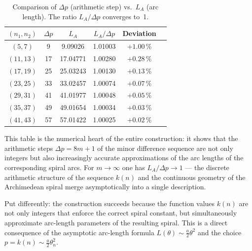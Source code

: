 \begin{table}[H]
\centering
\caption{Comparison of $\Delta p$ (arithmetic step) vs.\ $L_A$ (arc length).
  The ratio $L_A / \Delta p$ converges to~1.}
\renewcommand{\arraystretch}{1.2}
\begin{tabular}{cccccc}
\toprule
$(n_1, n_2)$ & $\Delta p$ & $L_A$ & $L_A / \Delta p$ & Deviation \\
\midrule
$( 5,  7)$ &  9 &  9.09026 & 1.01003 & $+1.00\,\%$ \\
$(11, 13)$ & 17 & 17.04771 & 1.00280 & $+0.28\,\%$ \\
$(17, 19)$ & 25 & 25.03243 & 1.00130 & $+0.13\,\%$ \\
$(23, 25)$ & 33 & 33.02457 & 1.00074 & $+0.07\,\%$ \\
$(29, 31)$ & 41 & 41.01977 & 1.00048 & $+0.05\,\%$ \\
$(35, 37)$ & 49 & 49.01654 & 1.00034 & $+0.03\,\%$ \\
$(41, 43)$ & 57 & 57.01422 & 1.00025 & $+0.02\,\%$ \\
\bottomrule
\end{tabular}
\end{table}

\begin{remark}
This table is the numerical heart of the entire construction: it shows
that the arithmetic steps $\Delta p = 8m+1$ of the minor difference sequence
are not only integers but also increasingly accurate approximations of the
arc lengths of the corresponding spiral arcs. For $m \to \infty$ one has
$L_A / \Delta p \to 1$ --- the discrete arithmetic structure of the sequence $k(n)$
and the continuous geometry of the Archimedean spiral merge
asymptotically into a single description.

Put differently: the construction succeeds because the
function values $k(n)$ are not only integers that enforce the correct spiral
constant, but simultaneously approximate arc-length parameters of the
resulting spiral. This is a direct consequence
of the asymptotic arc-length formula $L(\theta) \sim \frac{a}{2}\theta^2$ and
the choice $p = k(n) \sim \frac{a}{2}\theta_n^2$.
\end{remark}

